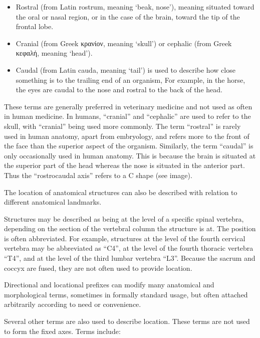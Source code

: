 \documentclass[]{book}
\providecommand{\tightlist}{%
  \setlength{\itemsep}{0pt}\setlength{\parskip}{0pt}}
\begin{document}
\begin{itemize}
\tightlist
\item
  Rostral (from Latin rostrum, meaning `beak, nose'), meaning situated toward the oral or nasal region, or in the case of the brain, toward the tip of the frontal lobe.
\item
  Cranial (from Greek κρανίον, meaning `skull') or cephalic (from Greek κεφαλή, meaning `head').
\item
  Caudal (from Latin cauda, meaning `tail') is used to describe how close something is to the trailing end of an organism,
  For example, in the horse, the eyes are caudal to the nose and rostral to the back of the head.
\end{itemize}

These terms are generally preferred in veterinary medicine and not used as often in human medicine. In humans, ``cranial'' and ``cephalic'' are used to refer to the skull, with ``cranial'' being used more commonly. The term ``rostral'' is rarely used in human anatomy, apart from embryology, and refers more to the front of the face than the superior aspect of the organism. Similarly, the term ``caudal'' is only occasionally used in human anatomy. This is because the brain is situated at the superior part of the head whereas the nose is situated in the anterior part. Thus the ``rostrocaudal axis'' refers to a C shape (see image).

The location of anatomical structures can also be described with relation to different anatomical landmarks.

Structures may be described as being at the level of a specific spinal vertebra, depending on the section of the vertebral column the structure is at. The position is often abbreviated. For example, structures at the level of the fourth cervical vertebra may be abbreviated as ``C4'', at the level of the fourth thoracic vertebra ``T4'', and at the level of the third lumbar vertebra ``L3''. Because the sacrum and coccyx are fused, they are not often used to provide location.

Directional and locational prefixes can modify many anatomical and morphological terms, sometimes in formally standard usage, but often attached arbitrarily according to need or convenience.

Several other terms are also used to describe location. These terms are not used to form the fixed axes. Terms include:
\end{document}
